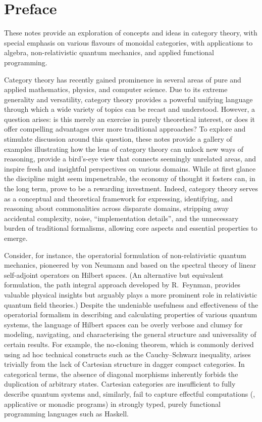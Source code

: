 \chapter*{Preface}


These notes provide an exploration of concepts and ideas in category theory, with special emphasis on various flavours of monoidal categories, with applications to algebra, non-relativistic quantum mechanics, and applied functional programming. 

Category theory has recently gained prominence in several areas of pure and applied mathematics, physics, and computer science. 
Due to its extreme generality and versatility, category theory provides a powerful unifying language through which a wide variety of topics can be recast and understood. 
However, a question arises: is this merely an exercise in purely theoretical interest, or does it offer compelling advantages over more traditional approaches? 
To explore and stimulate discussion around this question, these notes provide a gallery of examples illustrating how the lens of category theory can unlock new ways of reasoning, provide a bird's-eye view that connects seemingly unrelated areas, and inspire fresh and insightful perspectives on various domains. 
While at first glance the discipline might seem impenetrable, the economy of thought it fosters can, in the long term, prove to be a rewarding investment.
Indeed, category theory serves as a conceptual and theoretical framework for expressing, identifying, and reasoning about commonalities across disparate domains, stripping away accidental complexity, noise, ``implementation details'', and the unnecessary burden of traditional formalisms, allowing core aspects and essential properties to emerge.

Consider, for instance, the operatorial formulation of non-relativistic quantum mechanics, pioneered by von Neumann and based on the spectral theory of linear self-adjoint operators on Hilbert spaces. (An alternative but equivalent formulation, the path integral approach developed by R.~Feynman, provides valuable physical insights but arguably plays a more prominent role in relativistic quantum field theories.) Despite the undeniable usefulness and effectiveness of the operatorial formalism in describing and calculating properties of various quantum systems, the language of Hilbert spaces can be overly verbose and clumsy for modeling, navigating, and characterising the general structure and universality of certain results.
For example, the no-cloning theorem, which is commonly derived using ad hoc technical constructs such as the Cauchy--Schwarz inequality, arises trivially from the lack of Cartesian structure in dagger compact categories. 
In categorical terms, the absence of diagonal morphisms inherently forbids the duplication of arbitrary states.
Cartesian categories are insufficient to fully describe quantum systems and, similarly, fail to capture effectful computations (\eg, applicative or monadic programs) in strongly typed, purely functional programming languages such as Haskell.

